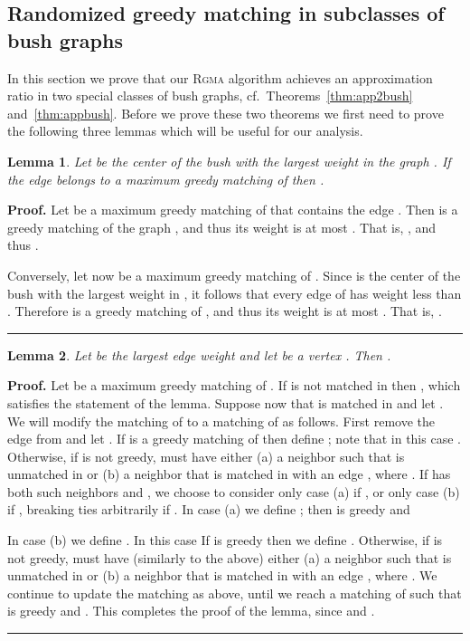 \documentclass[a4paper,11pt]{article}
\newtheorem{lemma}{Lemma}
\newenvironment{proof}[1][Proof]{\noindent\textbf{#1.} }{\ \rule{0.5em}{0.5em}}
\begin{document}
\subsection{Randomized greedy matching in subclasses of bush graphs\label {two-bush-subsec}}

In this section we prove that our \textsc{Rgma}\xspace algorithm achieves an
approximation ratio  in two special classes of bush
graphs, cf.~Theorems~\ref{thm:app2bush} and~\ref{thm:appbush}. Before we
prove these two theorems we first need to prove the following three lemmas
which will be useful for our analysis.

\begin{lemma}
\label{claim0-lem} Let  be the center of the bush with the largest weight
in the graph . If the edge  belongs to a maximum greedy matching
of  then .
\end{lemma}

\begin{proof}
Let  be a maximum greedy matching of  that contains the
edge . Then  is a greedy matching of
the graph , and thus its weight is at most .
That is, ,
and thus .

Conversely, let now  be a maximum greedy matching of . Since  is the center of the bush with the largest weight in ,
it follows that every edge of  has weight less than . Therefore 
 is a greedy matching of , and
thus its weight is at most . That is, .
\end{proof}

\begin{lemma}
\label{claim1-1-lem}Let  be the largest edge weight  and let 
be a vertex . Then .
\end{lemma}

\begin{proof}
Let  be a maximum greedy matching of . If  is not matched
in  then , which satisfies
the statement of the lemma. Suppose now that  is matched in 
and let . We will modify the matching  of 
 to a matching  of  as follows. First remove
the edge  from  and let . If  is a greedy matching of 
then define ; note that in this case .
Otherwise, if  is not greedy,  must have either (a) a
neighbor  such that  is unmatched in  or (b) a neighbor  that is matched in  with an
edge , where . If  has both
such neighbors  and , we choose to consider only case
(a) if , or only case (b) if , breaking ties arbitrarily if . In case (a) we define ; then  is greedy and 


In case (b) we define . In this case 
If  is greedy then we define . Otherwise, if  is not greedy,  must have (similarly to the above) either (a) a neighbor  such that  is unmatched in  or (b) a neighbor  that is matched in  with an
edge , where . We continue to
update the matching  as above, until we reach a
matching  of  such that 
is greedy and . 
This completes the proof of the lemma, since  and .
\end{proof}
\end{document}
